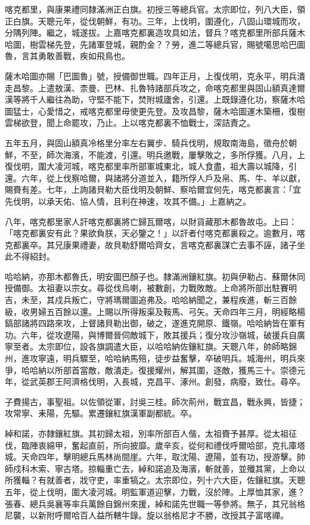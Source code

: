 \begin{pinyinscope}
喀克都里，與康果禮同隸滿洲正白旗。初授三等總兵官。太宗即位，列八大臣，領正白旗。天聰元年，從伐朝鮮，有功。三年，上伐明，圍遵化，八固山環城而攻，分隅列陣。繼之，城遂拔。上嘉喀克都裏造攻具如法，督兵？喀克都里所部兵薩木哈圖，樹雲梯先登，先諸軍登城，親酌金？？勞，進二等總兵官，賜號噶思哈巴圖魯，言其勇敢善戰，疾如飛鳥也。

薩木哈圖亦賜「巴圖魯」號，授備御世職。四年正月，上復伐明，克永平，明兵潰走昌黎。上遣敖漢、柰曼、巴林、扎魯特諸部兵攻之，命喀克都里與固山額真達爾漢等將千人繼往為助，守堅不能下，焚附城廬舍，引還。上既錄遵化功，察薩木哈圖猛士，心愛惜之，戒喀克都里毋使更先登。及攻昌黎，薩木哈圖運木築柵，復樹雲梯欲登，聞上命罷攻，乃止。上以喀克都裏不恤戰士，深詰責之。

五年五月，與固山額真冷格里分率左右翼步、騎兵伐明，規取南海島，徵舟於朝鮮，不至，師次海濱，不能渡，引還。明兵邀戰，屢擊敗之，多所俘獲。八月，上復伐明，圍大凌河城，喀克都里率所部軍城東北，城人食盡，祖大壽以城降，引還。六年，從上伐察哈爾，與諸將分道並入，籍所俘人戶及帛、馬、牛、羊以獻，賜賚有差。七年，上詢諸貝勒大臣伐明及朝鮮、察哈爾宜何先，喀克都裏言：「宜先伐明，以承天佑、協人情，且利在神速，攻其不備。」上嘉納之。

八年，喀克都里家人訐喀克都裏將亡歸瓦爾喀，以財貨藏那木都魯故屯。上曰：「喀克都裏安有此？果欲負朕，天必鑒之！」以訐者付喀克都裏殺之。逾數月，喀克都裏卒。其兄康果禮妻，故貝勒舒爾哈齊女，言喀克都裏謀亡去事不誣，諸子坐此不得紹封。

哈哈納，亦那木都魯氏，明安圖巴顏子也。隸滿洲鑲紅旗。初與伊勒占、蘇爾休同授備御。太祖妻以宗女。尋從伐烏喇，被數創，力戰敗敵。上命將所部出駐賽明吉，未至，其戍兵叛亡，守將瑪爾圖追弗及。哈哈納聞之，兼程疾進，斬三百餘級，收男婦五百餘以還。上賜以所得叛渠及鞍馬、弓矢。天命四年三月，明經略楊鎬部諸將四路來攻，上督諸貝勒出御，破之，遂進克開原、鐵嶺。哈哈納皆在軍有功。六年，從攻遼陽，與博爾晉伺敵城下，敗其援兵；復分攻沙嶺城，破援兵自廣寧至者。太宗即位，設各旗調遣大臣，以哈哈納佐鑲紅旗。天聰八年，帥師略錦州，進攻寧遠，明兵驟至，哈哈納馬殕，徒步益奮擊，卒破明兵。城海州，明兵來爭，哈哈納以所部首當敵，敵潰走。復援耀州，解其圍，逐敵，獲馬三十。崇德元年，從武英郡王阿濟格伐明，入長城，克昌平、涿州。創發，病廢，致仕。尋卒。

子費揚古，事聖祖。以佐領從軍，討吳三桂。師次荊州，戰宜昌，戰永興，皆捷；攻常寧、耒陽，先驅。累遷鑲紅旗漢軍副都統。卒。

綽和諾，亦隸鑲紅旗。其初歸太祖，別率所部百人偕，太祖賚予甚厚。從太祖征伐，臨陣衷綿甲，奮起直前，所向披靡。歲辛亥，從何和禮伐呼爾哈部，克扎庫塔城。天命四年，擊明總兵馬林尚間崖。六年，取沈陽、遼陽，並有功，授游擊。帥師戍科木索、寧古塔。掠輜重亡去，綽和諾追及海濱，斬就善，並殲其黨，上命以所獲輜？有就善者，戕守吏，率重犒之。太宗即位，列十六大臣，佐鑲紅旗。天聰五年，從上伐明，圍大凌河城。明監軍道迎擊，力戰，沒於陣。上厚恤其家，進？張春、總兵吳襄等率兵萬餘自錦州來援，綽和諾先世職一等參將。無子，其兄翁格尼襲，以新附呼爾哈百人益所轄牛錄。旋以翁格尼才不勝，改授其子富喀禪。


\end{pinyinscope}
